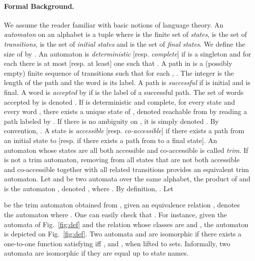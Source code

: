 \documentclass[]{llncs}
\begin{document}
\paragraph*{Formal Background.}
We assume the reader familiar with basic notions of language theory.
An {\it automaton}  on an alphabet  is a tuple
 where  is the finite set of {\it states},  is the set of {\it transitions},  is
the set of {\it initial states} and  is the set of {\it final
  states}. We define the size of  by . An automaton is
{\it deterministic} [resp. {\it complete}] if  is a singleton and for
each  there is at most [resp. at least] one  such that . A path in  is a (possibly empty) finite
sequence of transitions  such that for
each , . The integer  is the length of the path and the
word  is its label. A path is {\it successful} if  is
initial and  is final. A word  is {\it accepted} by  if  is
the label of a successful path. The set of words accepted by  is denoted
. If  is deterministic and complete, for every state  and
every word , there exists a unique state of , denoted 
reachable from  by reading a path labeled by . If there is no
ambiguity on , it is simply denoted . By convention, . A state  is {\it accessible} [resp. {\it
    co-accessible}] if there exists a path from an initial state to 
                 [resp. if there exists a path from  to a final state].
                 An automaton whose states are all both accessible and
                 co-accessible is called {\it trim}. If  is not a trim
                 automaton, removing from  all states that are not both
                 accessible and co-accessible together with all related
                 transitions provides an equivalent trim automaton. Let
                  and
                  be two automata over the
                 same alphabet, the product of  and  is the
                 automaton , denoted , where
                 . By definition, . Let
                 
                 be the trim automaton obtained from , given an
                 equivalence relation ,
                  denotes the automaton
                  where
                 . One can easily check
                 that . For instance,
                 given the automata of Fig.~\ref{fig:def} and the
                 relation  whose classes are  and , the automaton
                  is depicted on
                 Fig.~\ref{fig:def}. Two automata
                  and
                  are isomorphic if
                 there exists a one-to-one function  satisfying  iff
                 , and , 
                 when lifted to sets. Informally, two automata are
                 isomorphic if they are equal up to state names.
\end{document}
